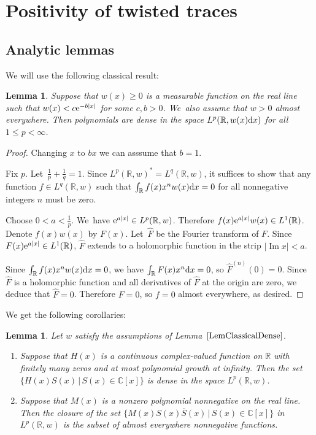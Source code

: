 \documentclass[10pt,a4paper]{amsart}
\newcommand{\RN}{\mathbb{R}} %
\newcommand{\CN}{\mathbb{C}} %
\newcommand{\ovl}{\overline}
\renewcommand{\Im}{\mathop{\mathrm{Im}}\nolimits}
\newtheorem{Lemma}[Theorem]{Lemma}
\theoremstyle{definition}
\numberwithin{equation}{section}
\begin{document}
\section{Positivity of twisted traces}\label{sec4}

\subsection{Analytic lemmas}
We will use the following classical result:
\begin{Lemma}
\label{LemClassicalDense}
Suppose that $w(x)\ge 0$ is a measurable function on the real line such that $w(x)<c {\rm e}^{-b|x|}$ for some $c,b>0$. We~also assume that $w>0$ almost everywhere. Then polynomials are dense in the space $L^p(\RN,w(x){\rm d}x)$ for all $1\leq p<\infty$.
\end{Lemma}
\begin{proof}
Changing $x$ to $bx$ we can asssume that $b=1$.

Fix $p$. Let~$\frac{1}{p}+\frac{1}{q}=1$. Since $L^p(\RN,w)^*=L^q(\RN,w)$, it suffices to show that any function $f\in L^q(\RN,w)$ such that $\int_{\RN} f(x)x^n w(x){\rm d}x=0$ for all nonnegative integers $n$ must be zero.

Choose $0<a<\frac{1}{p}$. We~have ${\rm e}^{a|x|}\in L^p(\RN,w)$. Therefore $f(x){\rm e}^{a|x|}w(x)\in L^1(\RN)$. Denote $f(x)w(x)$ by $F(x)$. Let~$\widehat{F}$ be the Fourier transform of $F$. Since $F(x){\rm e}^{a|x|}\in L^1(\RN)$, $\widehat{F}$ extends to a holomorphic function in the strip $|\Im x|<a$.

Since $\int_{\RN}f(x)x^n w(x){\rm d}x=0$, we have $\int_{\RN}F(x)x^n{\rm d}x=0$, so $\widehat{F}^{(n)}(0)=0$. Since $\widehat{F}$ is a holomorphic function and all derivatives of $\widehat{F}$ at the origin are zero, we deduce that $\widehat{F}=0$. Therefore $F=0$, so $f=0$ almost everywhere, as desired.
\end{proof}
We get the following corollaries:
\begin{Lemma}\label{CorClassical}
Let $w$ satisfy the assumptions of Lemma~$\ref{LemClassicalDense}$.
\begin{enumerate}\itemsep=0pt
\item[$1.$]
Suppose that $H(x)$ is a continuous complex-valued function on $\mathbb R$ with finitely many zeros and at most polynomial growth at infinity. Then the set $\{H(x)S(x)\,|\, S(x)\in\CN[x]\}$ is dense in the space $L^p(\RN,w)$.
\item[$2.$]
Suppose that $M(x)$ is a nonzero polynomial nonnegative on the real line. Then the closure of the set $\{M(x)S(x)\ovl{S}(x)\,|\, S(x)\in \CN[x]\}$ in $L^p(\RN,w)$ is the subset of almost everywhere nonnegative functions.
\end{enumerate}
\end{Lemma}
\end{document}
